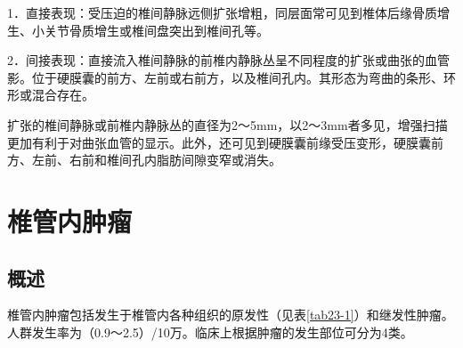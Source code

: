 1．直接表现：受压迫的椎间静脉远侧扩张增粗，同层面常可见到椎体后缘骨质增生、小关节骨质增生或椎间盘突出到椎间孔等。

2．间接表现：直接流入椎间静脉的前椎内静脉丛呈不同程度的扩张或曲张的血管影。位于硬膜囊的前方、左前或右前方，以及椎间孔内。其形态为弯曲的条形、环形或混合存在。

扩张的椎间静脉或前椎内静脉丛的直径为2～5mm，以2～3mm者多见，增强扫描更加有利于对曲张血管的显示。此外，还可见到硬膜囊前缘受压变形，硬膜囊前方、左前、右前和椎间孔内脂肪间隙变窄或消失。

\section{椎管内肿瘤}

\subsection{概述}

椎管内肿瘤包括发生于椎管内各种组织的原发性（见表\ref{tab23-1}）和继发性肿瘤。人群发生率为（0.9～2.5）/10万。临床上根据肿瘤的发生部位可分为4类。

